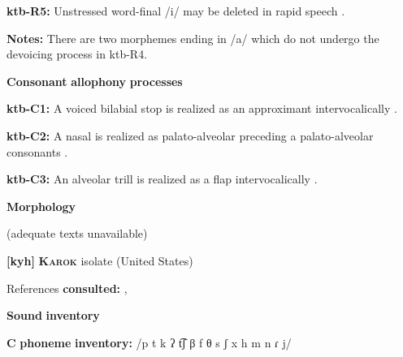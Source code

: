 \begin{styleBody}
\textbf{ktb-R5:} Unstressed word-final /i/ may be deleted in rapid speech \citep[20]{Treis2008}.
\end{styleBody}

\begin{styleBody}
\textbf{Notes:} There are two morphemes ending in /a/ which do not undergo the devoicing process in ktb-R4.
\end{styleBody}

\begin{styleBody}
\textbf{Consonant} \textbf{allophony} \textbf{processes}
\end{styleBody}

\begin{styleBody}
\textbf{ktb-C1:} A voiced bilabial stop is realized as an approximant intervocalically \citep[24]{Treis2008}.
\end{styleBody}

\begin{styleBody}
\textbf{ktb-C2:} A nasal is realized as palato-alveolar preceding a palato-alveolar consonants \citep[34]{Treis2008}.
\end{styleBody}

\begin{styleBody}
\textbf{ktb-C3:} An alveolar trill is realized as a flap intervocalically \citep[35]{Treis2008}.
\end{styleBody}

\begin{styleBody}
\textbf{Morphology}
\end{styleBody}

\begin{styleBody}
(adequate texts unavailable)
\end{styleBody}

\begin{styleBody}
\textbf{[kyh]}   \textbf{\textsc{Karok}}  isolate (United States)
\end{styleBody}

\begin{styleBody}
References \textbf{consulted:} \citet{Bright1957}, \citet{Sandy2014}
\end{styleBody}

\begin{styleBody}
\textbf{Sound} \textbf{inventory}
\end{styleBody}

\begin{styleBody}
\textbf{C} \textbf{phoneme} \textbf{inventory:} /p t k ʔ t͡ʃ β f θ s ʃ x h m n ɾ j/
\end{styleBody}

